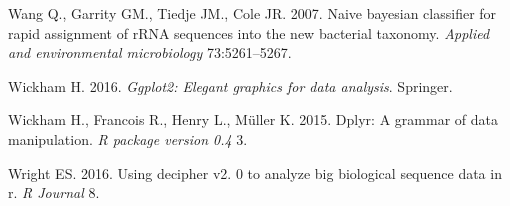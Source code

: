 \documentclass[11pt,]{article}
\begin{document}
\hypertarget{ref-wang2007naive}{}
Wang Q., Garrity GM., Tiedje JM., Cole JR. 2007. Naive bayesian
classifier for rapid assignment of rRNA sequences into the new bacterial
taxonomy. \emph{Applied and environmental microbiology} 73:5261--5267.

\hypertarget{ref-wickham2016ggplot2}{}
Wickham H. 2016. \emph{Ggplot2: Elegant graphics for data analysis}.
Springer.

\hypertarget{ref-wickham2015dplyr}{}
Wickham H., Francois R., Henry L., Müller K. 2015. Dplyr: A grammar of
data manipulation. \emph{R package version 0.4} 3.

\hypertarget{ref-wright2016using}{}
Wright ES. 2016. Using decipher v2. 0 to analyze big biological sequence
data in r. \emph{R Journal} 8.




\newpage
\singlespacing 
\end{document}
